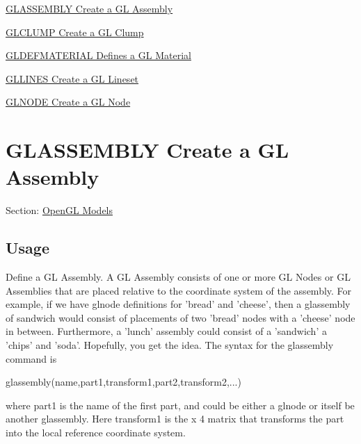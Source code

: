 
\begin{DoxyItemize}
\item \hyperlink{glwin_glassembly}{G\-L\-A\-S\-S\-E\-M\-B\-L\-Y Create a G\-L Assembly}  
\item \hyperlink{glwin_glclump}{G\-L\-C\-L\-U\-M\-P Create a G\-L Clump}  
\item \hyperlink{glwin_gldefmaterial}{G\-L\-D\-E\-F\-M\-A\-T\-E\-R\-I\-A\-L Defines a G\-L Material}  
\item \hyperlink{glwin_gllines}{G\-L\-L\-I\-N\-E\-S Create a G\-L Lineset}  
\item \hyperlink{glwin_glnode}{G\-L\-N\-O\-D\-E Create a G\-L Node}  
\end{DoxyItemize}\hypertarget{glwin_glassembly}{}\section{G\-L\-A\-S\-S\-E\-M\-B\-L\-Y Create a G\-L Assembly}\label{glwin_glassembly}
Section\-: \hyperlink{sec_glwin}{Open\-G\-L Models} \hypertarget{vtkwidgets_vtkxyplotwidget_Usage}{}\subsection{Usage}\label{vtkwidgets_vtkxyplotwidget_Usage}
Define a G\-L Assembly. A G\-L Assembly consists of one or more G\-L Nodes or G\-L Assemblies that are placed relative to the coordinate system of the assembly. For example, if we have {\ttfamily glnode} definitions for {\ttfamily 'bread'} and {\ttfamily 'cheese'}, then a {\ttfamily glassembly} of sandwich would consist of placements of two {\ttfamily 'bread'} nodes with a {\ttfamily 'cheese'} node in between. Furthermore, a {\ttfamily 'lunch'} assembly could consist of a {\ttfamily 'sandwich'} a {\ttfamily 'chips'} and {\ttfamily 'soda'}. Hopefully, you get the idea. The syntax for the {\ttfamily glassembly} command is \begin{DoxyVerb}   glassembly(name,part1,transform1,part2,transform2,...)
\end{DoxyVerb}
 where {\ttfamily part1} is the name of the first part, and could be either a {\ttfamily glnode} or itself be another {\ttfamily glassembly}. Here {\ttfamily transform1} is the { x 4 matrix} that transforms the part into the local reference coordinate system.

